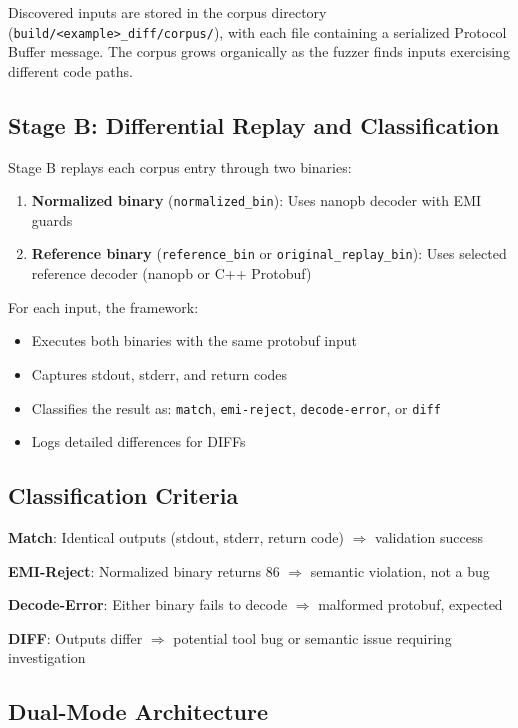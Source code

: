\documentclass[doublespace,nopageskip]{VTthesis}
\begin{document}
  Discovered inputs are stored in the corpus directory (\texttt{build/<example>\_diff/corpus/}), with each file containing a serialized Protocol Buffer message. The corpus grows organically as the fuzzer finds inputs exercising different code paths.

  \subsection{Stage B: Differential Replay and Classification}

  Stage B replays each corpus entry through two binaries:
  \begin{enumerate}
      \item \textbf{Normalized binary} (\texttt{normalized\_bin}): Uses nanopb decoder with EMI guards
      \item \textbf{Reference binary} (\texttt{reference\_bin} or \texttt{original\_replay\_bin}): Uses selected reference decoder (nanopb or C++ Protobuf)
  \end{enumerate}

  For each input, the framework:
  \begin{itemize}
      \item Executes both binaries with the same protobuf input
      \item Captures stdout, stderr, and return codes
      \item Classifies the result as: \texttt{match}, \texttt{emi-reject}, \texttt{decode-error}, or \texttt{diff}
      \item Logs detailed differences for DIFFs
  \end{itemize}

  \subsection{Classification Criteria}

  \textbf{Match}: Identical outputs (stdout, stderr, return code) $\Rightarrow$ validation success

  \textbf{EMI-Reject}: Normalized binary returns 86 $\Rightarrow$ semantic violation, not a bug

  \textbf{Decode-Error}: Either binary fails to decode $\Rightarrow$ malformed protobuf, expected

  \textbf{DIFF}: Outputs differ $\Rightarrow$ potential tool bug or semantic issue requiring investigation

  \subsection{Dual-Mode Architecture}
\end{document}
